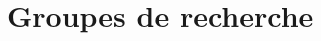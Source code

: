 \documentclass[11pt,a4paper,sans]{moderncv} %
\begin{document}

% 
% 
% 
% 
% 
% 


\section{\textbf{Groupes de recherche}}
\end{document}
